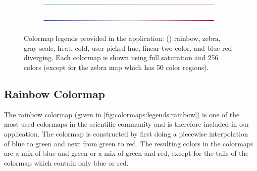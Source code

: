 \begin{figure}[b]
\begin{subfigure}{1\textwidth}
\begin{minipage}[l]{0.95\textwidth}
  		\end{minipage}
  	\end{subfigure}
  	\begin{subfigure}{1\textwidth}
  		\begin{minipage}[l]{0.05\textwidth}
    		\caption{} \label{fig:colormaps:legends::twocolors}
  		\end{minipage}
  	\hfill
  		\begin{minipage}[l]{0.95\textwidth}
    		\includegraphics[width=\textwidth,height=15px,keepaspectratio=false,frame]{colormapping/img/colormap_legends/twocolorscolormap.png}
  		\end{minipage}
  	\end{subfigure}
  	\begin{subfigure}{1\textwidth}
  		\begin{minipage}[l]{0.05\textwidth}
    		\caption{} \label{fig:colormaps:legends::diverging}
  		\end{minipage}
  	\hfill
  		\begin{minipage}[l]{0.95\textwidth}
    		\includegraphics[width=\textwidth,height=15px,keepaspectratio=false,frame]{colormapping/img/colormap_legends/divergingcolormap.png}
  		\end{minipage}
  	\end{subfigure}
\caption{Colormap legends provided in the application: 
() rainbow, 
 zebra,
 gray-scale,
 heat,
 cold,
 user picked hue,
 linear two-color, and
 blue-red diverging. Each colormap is shown using full saturation and 256 colors (except for the zebra map which has 50 color regions). 
 }\label{fig:colormaps:legends}
\end{figure}


\subsection{Rainbow Colormap} %
\label{ssub:rainbow_colormap}
The rainbow colormap (given in \cref{fig:colormaps:legends:rainbow}) is one of the most used colormaps in the scientific community and is therefore included in our application. The colormap is constructed by first doing a piecewise interpolation of blue to green and next from green to red. The resulting colors in the colormaps are a mix of blue and green or a mix of green and red, except for the tails of the colormap which contain only blue or red.

